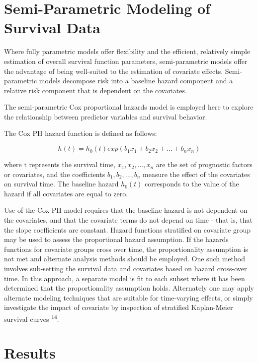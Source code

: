\documentclass[
]{article}
\begin{document}
\hypertarget{semi-parametric-modeling-of-survival-data}{%
\section{Semi-Parametric Modeling of Survival
Data}\label{semi-parametric-modeling-of-survival-data}}

Where fully parametric models offer flexibility and the efficient,
relatively simple estimation of overall survival function parameters,
semi-parametric models offer the advantage of being well-suited to the
estimation of covariate effects. Semi-parametric models decompose risk
into a baseline hazard component and a relative risk component that is
dependent on the covariates.

The semi-parametric Cox proportional hazards model is employed here to
explore the relationship between predictor variables and survival
behavior.

The Cox PH hazard function is defined as follows:

\[ h(t)=h_0(t)exp(b_1x_1+b_2x_2+...+b_nx_n) \]

where t represents the survival time, \(x_1,x_2,...,x_n\) are the set of
prognostic factors or covariates, and the coefficients
\(b_1,b_2,...,b_n\) measure the effect of the covariates on survival
time. The baseline hazard \(h_0(t)\) corresponds to the value of the
hazard if all covariates are equal to zero.

Use of the Cox PH model requires that the baseline hazard is not
dependent on the covariates, and that the covariate terms do not depend
on time - that is, that the slope coefficients are constant. Hazard
functions stratified on covariate group may be used to assess the
proportional hazard assumption. If the hazards functions for covariate
groups cross over time, the proportionality assumption is not met and
alternate analysis methods should be employed. One such method involves
sub-setting the survival data and covariates based on hazard cross-over
time. In this approach, a separate model is fit to each subset where it
has been determined that the proportionality assumption holds.
Alternately one may apply alternate modeling techniques that are
suitable for time-varying effects, or simply investigate the impact of
covariate by inspection of stratified Kaplan-Meier survival curves
\textsuperscript{14}.

\hypertarget{results}{%
\section{Results}\label{results}}
\end{document}
